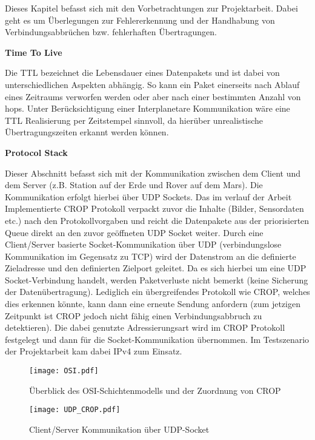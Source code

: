 

Dieses Kapitel befasst sich mit den Vorbetrachtungen zur Projektarbeit. Dabei
geht es um {\"U}berlegungen zur Fehlererkennung und der Handhabung von
Verbindungsabbr{\"u}chen bzw. fehlerhaften {\"U}bertragungen.

\textbf{Time To Live}

Die TTL bezeichnet die Lebensdauer eines Datenpakets und ist dabei von
unterschiedlichen Aspekten abh{\"a}ngig. So kann ein Paket einerseits nach
Ablauf eines Zeitraums verworfen werden oder aber nach einer bestimmten Anzahl
von hops. Unter Ber{\"u}cksichtigung einer Interplanetare Kommunikation w{\"a}re
eine TTL Realisierung per Zeitstempel sinnvoll, da hier{\"u}ber unrealistische
{\"U}bertragungszeiten erkannt werden k{\"o}nnen.

\textbf{Protocol Stack}

Dieser Abschnitt befasst sich mit der Kommunikation zwischen dem Client
und dem Server (z.B. Station auf der Erde und Rover auf dem Mars). Die
Kommunikation erfolgt hierbei {\"u}ber UDP Sockets. Das im verlauf der Arbeit
Implementierte CROP Protokoll verpackt zuvor die Inhalte (Bilder, Sensordaten etc.) 
nach den Protokollvorgaben und reicht die Datenpakete aus der priorisierten Queue 
direkt an den zuvor ge{\"o}ffneten UDP Socket weiter. Durch eine Client/Server
basierte Socket-Kommunikation {\"u}ber UDP 
(verbindungslose Kommunikation im Gegensatz zu TCP) wird der Datenstrom an die
definierte Zieladresse und den definierten Zielport geleitet. Da es sich
hierbei um eine UDP Socket-Verbindung handelt, werden Paketverluste nicht
bemerkt (keine Sicherung der Daten{\"u}bertragung). Lediglich ein {\"u}bergreifendes
Protokoll wie CROP, welches dies erkennen k{\"o}nnte, kann dann eine erneute
Sendung anfordern (zum jetzigen Zeitpunkt ist CROP jedoch nicht f{\"a}hig einen
Verbindungsabbruch zu detektieren). Die dabei genutzte Adressierungsart wird im
CROP Protokoll festgelegt und dann f{\"u}r die Socket-Kommunikation {\"u}bernommen. Im
Testszenario der Projektarbeit kam dabei IPv4 zum Einsatz.

\begin{figure}[H]
\centering
\texttt{[image: OSI.pdf]}
\caption{{\"U}berblick des OSI-Schichtenmodells und der Zuordnung von CROP}
\label{fig:OSI}
\end{figure}

\begin{figure}[H]
\centering
\texttt{[image: UDP\_CROP.pdf]}
\caption{Client/Server Kommunikation {\"u}ber UDP-Socket}
\label{fig:Socket-Kommunikation}
\end{figure}

